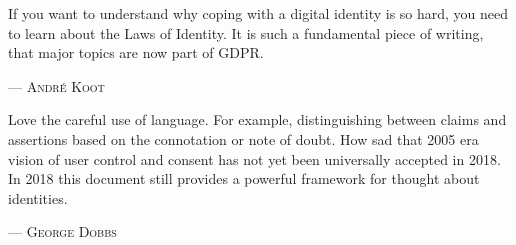 If you want to understand why coping with a digital identity is so hard, you need to learn about the Laws of Identity. It is such a fundamental piece of writing, that major topics are now part of GDPR. 
\setlength{\parindent}{0cm}\par\textsc{ --- André Koot }\par\vspace{12pt}\setlength{\parindent}{15pt}
Love the careful use of language.
  For example, distinguishing between claims and assertions based on the connotation or note of doubt.
  How sad that 2005 era vision of user control and consent has not yet been universally accepted in 2018.
  In 2018 this document still provides a powerful framework for thought about identities.
\setlength{\parindent}{0cm}\par\textsc{ --- George Dobbs }\par\vspace{12pt}\setlength{\parindent}{15pt}
